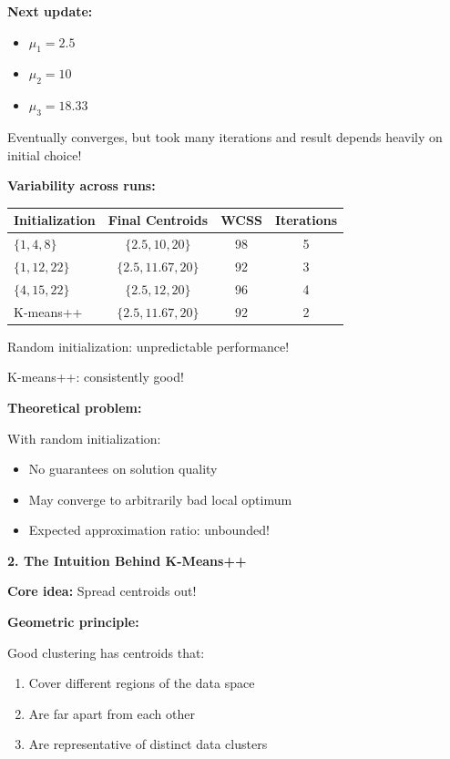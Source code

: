 \documentclass[12pt]{article}
\begin{document}
\begin{explanation}
\textbf{Next update:}
\begin{itemize}
    \item $\mu_1 = 2.5$
    \item $\mu_2 = 10$
    \item $\mu_3 = 18.33$
\end{itemize}

Eventually converges, but took many iterations and result depends heavily on initial choice!

\textbf{Variability across runs:}

\begin{center}
\begin{tabular}{l|c|c|c}
Initialization & Final Centroids & WCSS & Iterations \\
\hline
$\{1, 4, 8\}$ & $\{2.5, 10, 20\}$ & 98 & 5 \\
$\{1, 12, 22\}$ & $\{2.5, 11.67, 20\}$ & 92 & 3 \\
$\{4, 15, 22\}$ & $\{2.5, 12, 20\}$ & 96 & 4 \\
K-means++ & $\{2.5, 11.67, 20\}$ & 92 & 2 \\
\end{tabular}
\end{center}

Random initialization: unpredictable performance!

K-means++: consistently good!

\textbf{Theoretical problem:}

With random initialization:
\begin{itemize}
    \item No guarantees on solution quality
    \item May converge to arbitrarily bad local optimum
    \item Expected approximation ratio: unbounded!
\end{itemize}

\textbf{2. The Intuition Behind K-Means++}

\textbf{Core idea:} Spread centroids out!

\textbf{Geometric principle:}

Good clustering has centroids that:
\begin{enumerate}
    \item Cover different regions of the data space
    \item Are far apart from each other
    \item Are representative of distinct data clusters
\end{enumerate}


\end{explanation}
\end{document}
